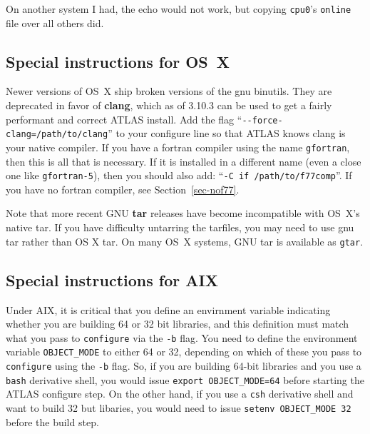 \documentclass[11pt]{article}
\begin{document}
On another system I had, the echo would not work, but copying \texttt{cpu0}'s 
\texttt{online} file over all others did.


\subsection{Special instructions for OS~X}
\label{sec-OSX}
Newer versions of OS~X ship broken versions of the gnu binutils.  They
are deprecated in favor of \textbf{clang}, which as of 3.10.3 can be used
to get a fairly performant and correct ATLAS install.  Add the flag
``\verb+--force-clang=/path/to/clang+'' to your configure line so that 
ATLAS knows clang is your native
compiler.  If you have a fortran compiler using the name {\tt gfortran},
then this is all that is necessary.   If it is installed in a different
name (even a close one like {\tt gfortran-5}), then you should also
add: ``\verb+-C if /path/to/f77comp+''.
If you have no fortran compiler, see Section~\ref{sec-nof77}.


Note that more recent GNU {\bf tar} releases have become incompatible with 
OS~X's native tar.  If you have difficulty untarring the tarfiles, you
may need to use gnu tar rather than OS X tar.  On many OS~X systems,
GNU tar is available as {\tt gtar}.

\subsection{Special instructions for AIX}
Under AIX, it is critical that you define an envirnment variable
indicating whether you are building 64 or 32 bit libraries, and
this definition must match what you pass to {\tt configure} via the
{\tt -b} flag.  You need to define the environment variable
{\tt OBJECT\_MODE} to either 64 or 32, depending on which of
these you pass to {\tt configure} using the {\tt -b} flag.  So, if you
are building 64-bit libraries and you use a {\tt bash} derivative
shell, you would issue {\tt export OBJECT\_MODE=64} before starting
the ATLAS configure step.  On the other hand, if you use a {\tt csh}
derivative shell and want to build 32 but libaries, you would need
to issue {\tt setenv OBJECT\_MODE 32} before the build step.
\end{document}
